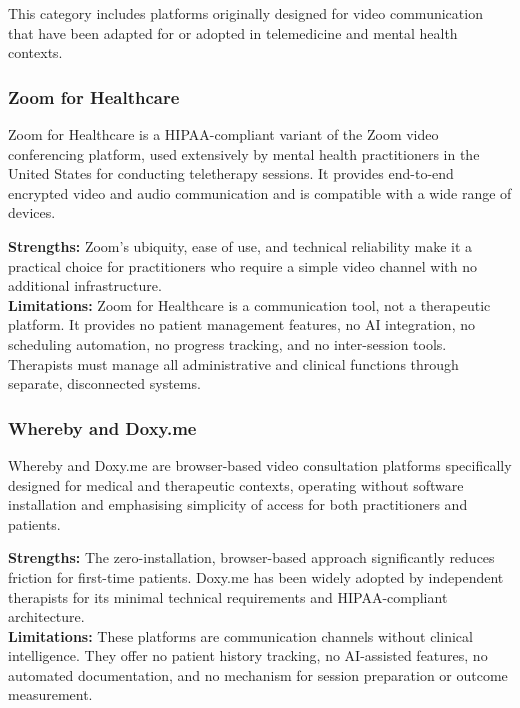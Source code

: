 This category includes platforms originally designed for video communication
that have been adapted for or adopted in telemedicine and mental health contexts.

\subsubsection{Zoom for Healthcare}

Zoom for Healthcare is a HIPAA-compliant variant of the Zoom video conferencing
platform, used extensively by mental health practitioners in the United States
for conducting teletherapy sessions. It provides end-to-end encrypted video and
audio communication and is compatible with a wide range of devices.

\begin{tcolorbox}[colback=lightgray, colframe=accentblue, title=\textbf{Zoom for Healthcare — Assessment}, fonttitle=\bfseries, sharp corners=south]
  \textbf{Strengths:} Zoom's ubiquity, ease of use, and technical reliability
  make it a practical choice for practitioners who require a simple video channel
  with no additional infrastructure. \\[4pt]
  \textbf{Limitations:} Zoom for Healthcare is a communication tool, not a
  therapeutic platform. It provides no patient management features, no AI
  integration, no scheduling automation, no progress tracking, and no
  inter-session tools. Therapists must manage all administrative and clinical
  functions through separate, disconnected systems.
\end{tcolorbox}

\subsubsection{Whereby and Doxy.me}

Whereby and Doxy.me are browser-based video consultation platforms specifically
designed for medical and therapeutic contexts, operating without software
installation and emphasising simplicity of access for both practitioners and
patients.

\begin{tcolorbox}[colback=lightgray, colframe=accentblue, title=\textbf{Whereby / Doxy.me — Assessment}, fonttitle=\bfseries, sharp corners=south]
  \textbf{Strengths:} The zero-installation, browser-based approach
  significantly reduces friction for first-time patients. Doxy.me has been widely
  adopted by independent therapists for its minimal technical requirements and
  HIPAA-compliant architecture. \\[4pt]
  \textbf{Limitations:} These platforms are communication channels without
  clinical intelligence. They offer no patient history tracking, no AI-assisted
  features, no automated documentation, and no mechanism for session preparation
  or outcome measurement.
\end{tcolorbox}

